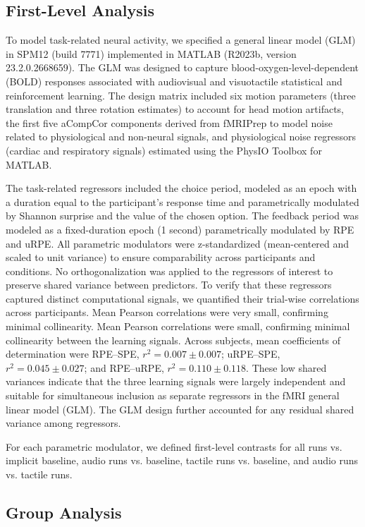 \documentclass{article}
\begin{document}
\subsection*{First-Level Analysis}

To model task-related neural activity, we specified a general linear model (GLM) in SPM12 (build 7771) implemented in MATLAB (R2023b, version 23.2.0.2668659). The GLM was designed to capture blood-oxygen-level-dependent (BOLD) responses associated with audiovisual and visuotactile statistical and reinforcement learning. The design matrix included six motion parameters (three translation and three rotation estimates) to account for head motion artifacts, the first five aCompCor components derived from fMRIPrep to model noise related to physiological and non-neural signals, and physiological noise regressors (cardiac and respiratory signals) estimated using the PhysIO Toolbox for MATLAB.

The task-related regressors included the choice period, modeled as an epoch with a duration equal to the participant's response time and parametrically modulated by Shannon surprise and the value of the chosen option. The feedback period was modeled as a fixed-duration epoch (1 second) parametrically modulated by RPE and uRPE. All parametric modulators were z-standardized (mean-centered and scaled to unit variance) to ensure comparability across participants and conditions. No orthogonalization was applied to the regressors of interest to preserve shared variance between predictors. To verify that these regressors captured distinct computational signals, we quantified their trial-wise correlations across participants. Mean Pearson correlations were very small, confirming minimal collinearity. Mean Pearson correlations were small, confirming minimal collinearity between the learning signals. Across subjects, mean coefficients of determination were RPE--SPE, $r^2 = 0.007 \pm 0.007$; uRPE--SPE, $r^2 = 0.045 \pm 0.027$; and RPE--uRPE, $r^2 = 0.110 \pm 0.118$. These low shared variances indicate that the three learning signals were largely independent and suitable for simultaneous inclusion as separate regressors in the fMRI general linear model (GLM). The GLM design further accounted for any residual shared variance among regressors.


For each parametric modulator, we defined first-level contrasts for all runs vs. implicit baseline, audio runs vs. baseline, tactile runs vs. baseline, and audio runs vs. tactile runs.

\subsection*{Group Analysis}
\end{document}
